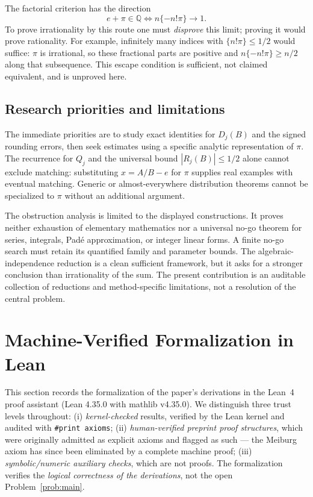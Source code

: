 \documentclass[11pt]{amsart}
\theoremstyle{definition}
\theoremstyle{remark}
\numberwithin{equation}{section}
\newcommand{\Q}{\mathbb{Q}}
\begin{document}
The factorial criterion has the direction
\[
e+\pi\in\Q\iff n\{-n!\pi\}\longrightarrow1.
\]
To prove irrationality by this route one must \emph{disprove} this limit; proving it would prove rationality. For example, infinitely many indices with $\{n!\pi\}\le1/2$ would suffice: $\pi$ is irrational, so these fractional parts are positive and $n\{-n!\pi\}\ge n/2$ along that subsequence. This escape condition is sufficient, not claimed equivalent, and is unproved here.

\subsection{Research priorities and limitations}

The immediate priorities are to study exact identities for $D_j(B)$ and the signed rounding errors, then seek estimates using a specific analytic representation of $\pi$. The recurrence for $Q_j$ and the universal bound $|R_j(B)|\le1/2$ alone cannot exclude matching: substituting $x=A/B-e$ for $\pi$ supplies real examples with eventual matching. Generic or almost-everywhere distribution theorems cannot be specialized to $\pi$ without an additional argument.

The obstruction analysis is limited to the displayed constructions. It proves neither exhaustion of elementary mathematics nor a universal no-go theorem for series, integrals, Pad\'e approximation, or integer linear forms. A finite no-go search must retain its quantified family and parameter bounds. The algebraic-independence reduction is a clean sufficient framework, but it asks for a stronger conclusion than irrationality of the sum. The present contribution is an auditable collection of reductions and method-specific limitations, not a resolution of the central problem.

\section{Machine-Verified Formalization in Lean}\label{sec:lean}

This section records the formalization of the paper's derivations in the Lean~4 proof assistant (Lean 4.35.0 with mathlib v4.35.0). We distinguish three trust levels throughout: (i) \emph{kernel-checked} results, verified by the Lean kernel and audited with \texttt{\#print axioms}; (ii) \emph{human-verified preprint proof structures}, which were originally admitted as explicit axioms and flagged as such --- the Meiburg axiom has since been eliminated by a complete machine proof; (iii) \emph{symbolic/numeric auxiliary checks}, which are not proofs. The formalization verifies the \emph{logical correctness of the derivations}, not the open Problem~\ref{prob:main}.
\end{document}
